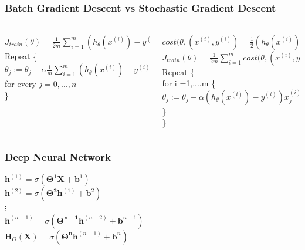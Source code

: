 \documentclass{beamer}
\begin{document}
  \begin{frame}
  	\frametitle{Batch Gradient Descent vs Stochastic Gradient Descent}
  	\begin{columns}
  		\begin{column}{0.5\textwidth}
  			$J_{train}(\theta)=\frac{1}{2m}\sum\limits_{i=1}^{m}(h_{\theta}(x^{(i)})-y^{(i)})^{2}$\\ \vspace{1cm}
  			Repeat \{ \vspace{0.5cm}
  			$\theta_{j}:=\theta_{j}-\alpha\frac{1}{m}\sum\limits_{i=1}^{m}(h_{\theta}(x^{(i)})-y^{(i)})x_{j}^{(i)}$\\
  			for every $j=0,...,n$ \vspace{0.5cm} \\
  			\}
  		\end{column}
  		\begin{column}{0.5\textwidth}  %
			${cost(\theta,(x^{(i)},y^{(i)})=\frac{1}{2}(h_{\theta}(x^{(i)})-y^{(i)})^{2}}$\\
			$J_{train}(\theta)=\frac{1}{2m}\sum\limits_{i=1}^{m}cost(\theta,(x^{(i)},y^{(i)})$\\ \vspace{0.5cm}		
			Repeat \{\\ \vspace{0.5cm}
			for i =1,....m \{
			$\theta_{j}:=\theta_{j}-\alpha(h_{\theta}(x^{(i)})-y^{(i)})x_{j}^{(i)}$\\
			  \vspace{0.5cm} \}\\
			\}			
  		\end{column}
  	\end{columns}
  \end{frame}
 
 \begin{frame}
 	\frametitle{Deep Neural Network}
 	$\textbf{h}^{(1)}=\sigma(\mathbf{\Theta^{1}} \mathbf{X}+\textbf{b}^{1})$ \\
 	$\textbf{h}^{(2)}=\sigma(\mathbf{\Theta^{2}} \textbf{h}^{(1)}+\textbf{b}^{2})$ \\
 	$\vdots$ \\
 	$\textbf{h}^{(n-1)}=\sigma(\mathbf{\Theta^{n-1}} \textbf{h}^{(n-2)}+\textbf{b}^{n-1})$ \\
 	$\textbf{H}_{\Theta}(\textbf{X})=\sigma(\mathbf{\Theta^{n}} \textbf{h}^{(n-1)}+\textbf{b}^{n})$ \\
 \end{frame} 
 
\end{document}
